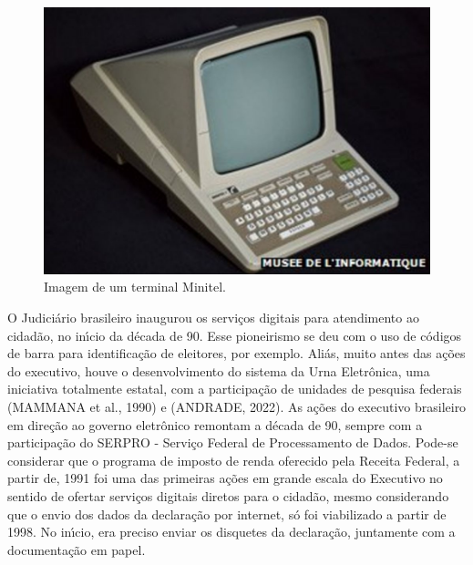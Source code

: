 \documentclass[
12pt,		%
openright,	%
twoside,  %
a4paper,			%
chapter=TITLE,		%
english,			%
french,				%
spanish,			%
brazil				%
]{USPSC-classe/USPSC}
\begin{document}
\captionsetup{format=plain}
\begin{figure}[max size={\textwidth}{\textheight}]

\centering


\begin{minipage}[b]{0.4\linewidth}
        \centering
                \includegraphics[width=1.0\linewidth]{../../imagens/minitel.jpg}
                \caption{Imagem de um terminal Minitel.}
                \label{5d9a2782548e094108d5241aeff768916b33be6c}
\end{minipage}%
\hspace{0.5cm}
\end{figure}



O Judici\'ario brasileiro inaugurou os servi\c{c}os digitais para atendimento ao cidad\~ao, no in\'{\i}cio da d\'ecada de 90. Esse pioneirismo se deu com o uso de c\'odigos de barra para identifica\c{c}\~ao de eleitores, por exemplo. Ali\'as, muito antes das a\c{c}\~oes do executivo, houve o desenvolvimento do sistema da Urna Eletr\^onica, uma iniciativa totalmente estatal, com a participa\c{c}\~ao de unidades de pesquisa federais (MAMMANA et al., 1990) e (ANDRADE, 2022). As a\c{c}\~oes do executivo brasileiro em dire\c{c}\~ao ao governo eletr\^onico remontam a d\'ecada de 90, sempre com a participa\c{c}\~ao do SERPRO - Servi\c{c}o Federal de Processamento de Dados. Pode-se considerar que o programa de imposto de renda oferecido pela Receita Federal, a partir de, 1991 foi uma das primeiras a\c{c}\~oes em grande escala do Executivo no sentido de ofertar servi\c{c}os digitais diretos para o cidad\~ao, mesmo considerando que o envio dos dados da declara\c{c}\~ao por internet, s\'o foi viabilizado a partir de 1998. No in\'{\i}cio, era preciso enviar os disquetes da declara\c{c}\~ao, juntamente com a documenta\c{c}\~ao em papel.
\end{document}
